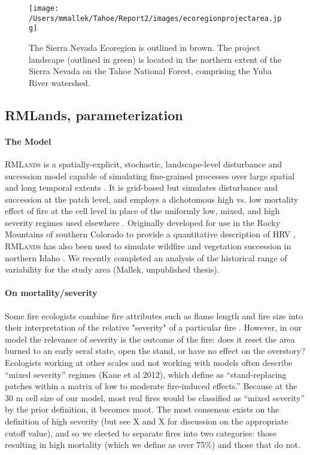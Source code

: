 \documentclass[12pt]{article}
\begin{document}
\begin{spacing}{1}
\begin{figure}
\texttt{[image: /Users/mmallek/Tahoe/Report2/images/ecoregionprojectarea.jpg]}
\caption{The Sierra Nevada Ecoregion is outlined in brown. The project landscape (outlined in green) is located in the northern extent of the Sierra Nevada on the Tahoe National Forest, comprising the Yuba River watershed.}
\label{projectarea}
\end{figure}


\subsection*{RMLands, parameterization}

\paragraph{The Model}
\textsc{RMLands} is a spatially-explicit, stochastic, landscape-level disturbance and succession model capable of simulating fine-grained processes over large spatial and long temporal extents \citep{McGarigal2005}. It is grid-based but simulates disturbance and succession at the patch level, and employs a dichotomous high vs. low mortality effect of fire at the cell level in place of the uniformly low, mixed, and high severity regimes used elsewhere \citep{McGarigal2012}. Originally developed for use in the Rocky Mountains of southern Colorado to provide a quantitative description of HRV \citep{McGarigal2012}, \textsc{RMLands} has also been used to simulate wildfire and vegetation succession in northern Idaho \citep{Cushman2011}. We recently completed an analysis of the historical range of variability for the study area (Mallek, unpublished thesis).

\paragraph{On mortality/severity}
Some fire ecologists combine fire attributes such as flame length and fire size into their interpretation of the relative "severity" of a particular fire \citep{Agee1993}. However, in our model the relevance of severity is the outcome of the fire: does it reset the area burned to an early seral state, open the stand, or have no effect on the overstory?  Ecologists working at other scales and not working with models often describe ``mixed severity'' regimes (Kane et al 2012), which \citet{Collins2010} define as ``stand-replacing patches within a matrix of low to moderate fire-induced effects.'' Because at the 30 m cell size of our model, most real fires would be classified as ``mixed severity'' by the prior definition, it becomes moot. The most consensus exists on the definition of high severity (but see X and X for discussion on the appropriate cutoff value), and so we elected to separate fires into two categories: those resulting in high mortality (which we define as over 75\%) and those that do not.


\end{spacing}
\end{document}
